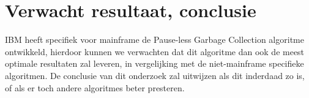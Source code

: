 





\section{Verwacht resultaat, conclusie}%
\label{sec:verwachte_resultaten}

IBM heeft specifiek voor mainframe de  Pause-less Garbage Collection algoritme ontwikkeld, hierdoor kunnen we verwachten dat dit algoritme dan ook de meest optimale resultaten zal leveren, in vergelijking met de niet-mainframe specifieke algoritmen.
De conclusie van dit onderzoek zal uitwijzen als dit inderdaad zo is, of als er toch andere algoritmes beter presteren.

